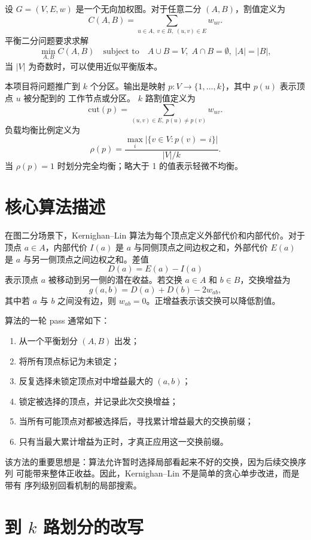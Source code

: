 \documentclass[UTF8, 11pt]{ctexart}
\begin{document}
设 $G=(V,E,w)$ 是一个无向加权图。对于任意二分 $(A,B)$，割值定义为
\[
    C(A,B) = \sum_{u\in A,\;v\in B,\;(u,v)\in E} w_{uv}.
\]
平衡二分问题要求求解
\[
    \min_{A,B} C(A,B)
    \quad
    \text{subject to}
    \quad
    A\cup B=V,\; A\cap B=\emptyset,\; |A|=|B|,
\]
当 $|V|$ 为奇数时，可以使用近似平衡版本。

本项目将问题推广到 $k$ 个分区。输出是映射
$p:V\to\{1,\ldots,k\}$，其中 $p(u)$ 表示顶点 $u$ 被分配到的 工作节点或分区。
$k$ 路割值定义为
\[
    \mathrm{cut}(p)
    =
    \sum_{(u,v)\in E,\; p(u)\neq p(v)} w_{uv}.
\]
负载均衡比例定义为
\[
    \rho(p)
    =
    \frac{\max_i |\{v\in V:p(v)=i\}|}{|V|/k}.
\]
当 $\rho(p)=1$ 时划分完全均衡；略大于 1 的值表示轻微不均衡。

\section{核心算法描述}

在图二分场景下，Kernighan--Lin 算法为每个顶点定义外部代价和内部代价。对于
顶点 $a\in A$，内部代价 $I(a)$ 是 $a$ 与同侧顶点之间边权之和，外部代价
$E(a)$ 是 $a$ 与另一侧顶点之间边权之和。差值
\[
    D(a) = E(a) - I(a)
\]
表示顶点 $a$ 被移动到另一侧的潜在收益。若交换 $a\in A$ 和 $b\in B$，交换增益为
\[
    g(a,b) = D(a) + D(b) - 2w_{ab},
\]
其中若 $a$ 与 $b$ 之间没有边，则 $w_{ab}=0$。正增益表示该交换可以降低割值。

算法的一轮 pass 通常如下：
\begin{enumerate}
    \item 从一个平衡划分 $(A,B)$ 出发；
    \item 将所有顶点标记为未锁定；
    \item 反复选择未锁定顶点对中增益最大的 $(a,b)$；
    \item 锁定被选择的顶点，并记录此次交换增益；
    \item 当所有可能顶点对都被选择后，寻找累计增益最大的交换前缀；
    \item 只有当最大累计增益为正时，才真正应用这一交换前缀。
\end{enumerate}

该方法的重要思想是：算法允许暂时选择局部看起来不好的交换，因为后续交换序列
可能带来整体正收益。因此，Kernighan--Lin 不是简单的贪心单步改进，而是带有
序列级别回看机制的局部搜索。

\section{到 $k$ 路划分的改写}
\end{document}
